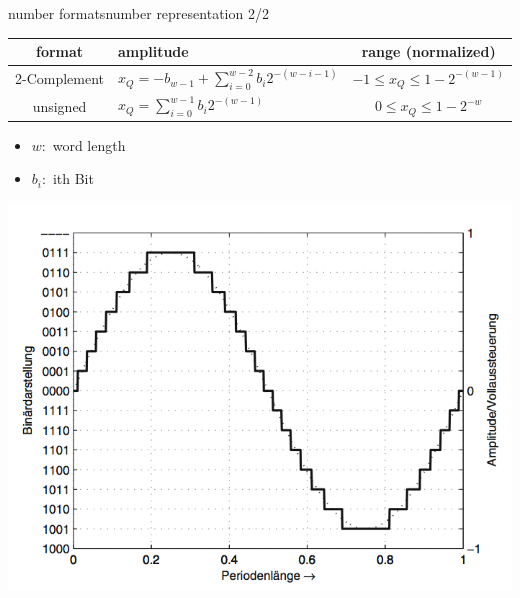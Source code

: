 	\begin{frame}{number formats}{number representation 2/2}
		\begin{table}
			\centering
			\begin{footnotesize}
				\begin{tabular}{clc}
				\hline
				\textbf{format} & \textbf{amplitude} & \textbf{range (normalized)}\\
				\hline
				2-Complement & $x_Q = -b_{w-1} + \sum\limits_{i=0}^{w-2}b_{i}2^{-(w-i-1)}$ & $-1\leq x_Q \leq 1-2^{-(w-1)}$\\
				unsigned & $x_Q = \sum\limits_{i=0}^{w-1}b_i2^{-(w-1)}$ & $0\leq x_Q \leq 1-2^{-w}$\\
				\hline
				\end{tabular}
			\end{footnotesize}
		\end{table}
		\begin{itemize}
			\item	$w:$ word length
			\item	$b_i:$ ith Bit
		\end{itemize}
        \vspace{-10mm}
	    \begin{flushright}
			\includegraphics[scale=0.5]{Graph/2complement}
		\end{flushright}
	\end{frame}
	
